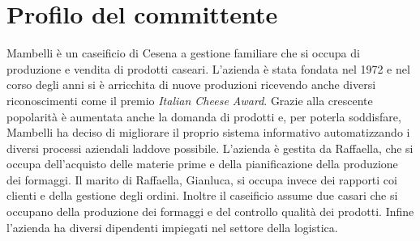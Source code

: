 \section{Profilo del committente}\label{sec:profilo-del-committente}
Mambelli è un caseificio di Cesena a gestione familiare che si occupa di produzione e vendita di prodotti caseari. L'azienda è stata fondata nel 1972 e nel corso degli anni si è arricchita di nuove produzioni ricevendo anche diversi riconoscimenti come il premio \emph{Italian Cheese Award}.
Grazie alla crescente popolarità è aumentata anche la domanda di prodotti e, per poterla soddisfare, Mambelli ha deciso di migliorare il proprio sistema informativo automatizzando i diversi processi aziendali laddove possibile.
L'azienda è gestita da Raffaella, che si occupa dell'acquisto delle materie prime e della pianificazione della produzione dei formaggi. Il marito di Raffaella, Gianluca, si occupa invece dei rapporti coi clienti e della gestione degli ordini. Inoltre il caseificio assume due casari che si occupano della produzione dei formaggi e del controllo qualità dei prodotti. Infine l'azienda ha diversi dipendenti impiegati nel settore della logistica.


